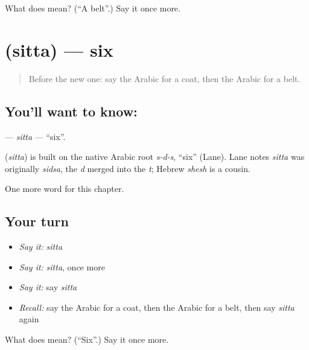\begin{tcolorbox}[breakable,colback=teal!4,colframe=teal!35!black,title={Before you move on}]
What does  mean? (\textquotedblleft{}A belt\textquotedblright{}.) Say it once more.
\end{tcolorbox}
\section[\texorpdfstring{\ar{ستة} (sitta)}{ستة (sitta)}]{ (sitta) — six}

\label{lesson:AR-C96-sitta}



\begin{quote}
Before the new one: say the Arabic for a coat, then the Arabic for a belt.
\end{quote}

\subsection*{You'll want to know: }
\textbf{} — \emph{sitta} — \textquotedblleft{}six\textquotedblright{}.

\begin{cousinweb}
\textbf{} (\emph{sitta}) is built on the native Arabic root \emph{s-d-s}, \textquotedblleft{}six\textquotedblright{} (Lane). Lane notes \emph{sitta} was originally \emph{sidsa}, the \emph{d} merged into the \emph{t}; Hebrew \emph{shesh} is a cousin.
\end{cousinweb}

\begin{grammarlens}[title={What you've built}]
One more word for this chapter.
\end{grammarlens}

\subsection*{Your turn}
\begin{itemize}
\raggedright
  \item \emph{Say it:} \emph{sitta}
  \item \emph{Say it:} \emph{sitta}, once more
  \item \emph{Say it:} say \emph{sitta}
  \item \emph{Recall:} say the Arabic for a coat, then the Arabic for a belt, then say \emph{sitta} again
\end{itemize}

\begin{tcolorbox}[breakable,colback=teal!4,colframe=teal!35!black,title={Before you move on}]
What does  mean? (\textquotedblleft{}Six\textquotedblright{}.) Say it once more.
\end{tcolorbox}

